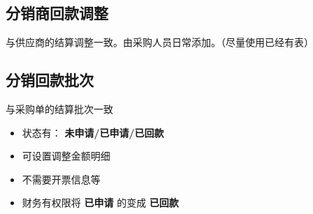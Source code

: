\documentclass[11pt]{article}
\begin{document}
\subsection{分销商回款调整}
\label{sec:orgaa1301c}
与供应商的结算调整一致。由采购人员日常添加。（尽量使用已经有表）
\subsection{分销回款批次}
\label{sec:orgbfae181}
与采购单的结算批次一致
\begin{itemize}
\item 状态有： \textbf{未申请/已申请/已回款}
\item 可设置调整金额明细
\item 不需要开票信息等
\item 财务有权限将 \textbf{已申请} 的变成 \textbf{已回款}
\end{itemize}
\end{document}
